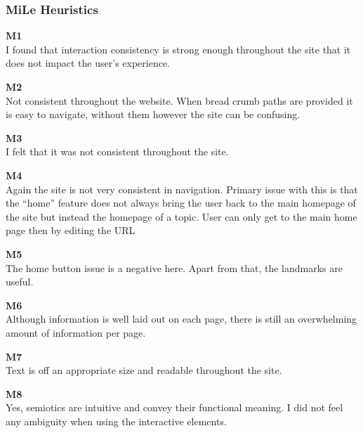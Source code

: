\subsubsection{MiLe Heuristics}
\begin{description}
    \item {\textbf{M1} \color{unicefGray}{Interaction consistency}}\\
    I found that interaction consistency is strong enough throughout the site that it does not impact the user’s experience. 
    \item {\textbf{M2} \color{unicefGray}{Group navigation}}\\
    Not consistent throughout the website. When bread crumb paths are provided it is easy to navigate, without them however the site can be confusing. 
    \item {\textbf{M3} \color{unicefGray}{Structural Navigation}}\\
    I felt that it was not consistent throughout the site. 
    \item {\textbf{M4} \color{unicefGray}{Semantic Navigation}}\\
    Again the site is not very consistent in navigation. Primary issue with this is that the “home” feature does not always bring the user back to the main homepage of the site but instead the homepage of a topic. User can only get to the main home page then by editing the URL
    \item {\textbf{M5} \color{unicefGray}{landmarks}}\\
    The home button issue is a negative here. Apart from that, the landmarks are useful.
    \item {\textbf{M6} \color{unicefGray}{Information overload}}\\
    Although information is well laid out on each page, there is still an overwhelming amount of information per page. 
    \item {\textbf{M7} \color{unicefGray}{Text layout}}\\
    Text is off an appropriate size and readable throughout the site.
    \item {\textbf{M8} \color{unicefGray}{Interaction placeholder semiotics}}\\
    Yes, semiotics are intuitive and convey their functional meaning. I did not feel any ambiguity when using the interactive elements.
    \begin{figure}[htp!]
        \centering

\end{figure}
\end{description}
